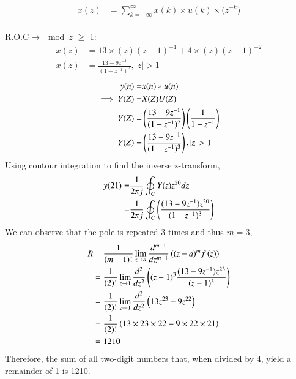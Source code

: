 \documentclass[journal,12pt,twocolumn]{IEEEtran}
\theoremstyle{remark}
\begin{document}
\begin{align}
     x(z)&=\sum\limits^{\infty}_{k=-\infty}{x(k)\times u(k)\times(z^{-k}})
\end{align}\\
R.O.C$\rightarrow$$\mod{z}$ $\geq$ 1:\\
\begin{align}
x(z)&=13\times (z)(z-1)^{-1}+4\times(z)(z-1)^{-2}\\
x(z)&=\frac{13-9z^{-1}}{(1-z^{-1})^2},|z|>1
\end{align}
\begin{align}
    y(n)=&x(n)*u(n)\\\implies Y(Z)=&X(Z)U(Z)\\Y(Z)=&\brak{\frac{13-9z^{-1}}{(1-z^{-1})^2}} \brak{\frac{1}{1-z^{-1}}}\\Y(Z)=&\brak{\frac{13-9z^{-1}}{(1-z^{-1})^{3}}},|z|>1
\end{align}
Using contour integration to find the inverse z-transform,
\begin{align}
    y(21)=&\frac{1}{2\pi j}\oint_{C}Y(z) z^{20} dz  \\=&\frac{1}{2\pi j}\oint_{C}\left(\frac{(13-9z^{-1})z^{20}}{(1-z^{-1})^{3}}\right)
\end{align}
We can observe that the pole is repeated $3$ times and thus $m=3$,
\begin{align}
    R&=\frac{1}{\left(m-1\right)!}\lim\limits_{z\to a}\frac{d^{m-1}}{dz^{m-1}}\left({(z-a)}^{m}f\left(z\right)\right)  \\&=\frac{1}{\left(2\right)!}\lim\limits_{z\to 1}\frac{d^{2}}{dz^{2}}\left({(z-1)}^{3}\frac{(13-9z^{-1})z^{23}}{(z-1)^{3}}\right)\\&=\frac{1}{\left(2\right)!}\lim\limits_{z\to 1}\frac{d^{2}}{dz^{2}}\left(13z^{23}-9z^{22}\right)\\&=\frac{1}{\left(2\right)!}\left(13\times 23\times 22-9\times 22\times21\right)\\&=1210
\end{align}
Therefore, the sum of all two-digit numbers that, when divided by 4, yield a remainder of 1 is 1210.\\
\end{document}
